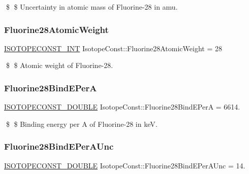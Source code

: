 \$ \$ Uncertainty in atomic mass of Fluorine-\/28 in amu. \mbox{\label{group___isotope_const-_fluorine-_f28_gaa76f1731bebf673389387279e14140bd}} 
\subsubsection{\texorpdfstring{Fluorine28\+Atomic\+Weight}{Fluorine28AtomicWeight}}
{\footnotesize\ttfamily \mbox{\hyperlink{group___isotope_const-_macros_ga5f18360b3e99483a35c32d789e62621c}{I\+S\+O\+T\+O\+P\+E\+C\+O\+N\+S\+T\+\_\+\+I\+NT}} Isotope\+Const\+::\+Fluorine28\+Atomic\+Weight = 28}

\$ \$ Atomic weight of Fluorine-\/28. \mbox{\label{group___isotope_const-_fluorine-_f28_ga71293ff1501021b2b8c144d0992b0a38}} 
\subsubsection{\texorpdfstring{Fluorine28\+Bind\+E\+PerA}{Fluorine28BindEPerA}}
{\footnotesize\ttfamily \mbox{\hyperlink{group___isotope_const-_macros_ga8f45a7272ce02c0b4c65c44636ed719a}{I\+S\+O\+T\+O\+P\+E\+C\+O\+N\+S\+T\+\_\+\+D\+O\+U\+B\+LE}} Isotope\+Const\+::\+Fluorine28\+Bind\+E\+PerA = 6614.}

\$ \$ Binding energy per A of Fluorine-\/28 in keV. \mbox{\label{group___isotope_const-_fluorine-_f28_gaaf6f4f9c20ae3f40e74d9b9031ad07ac}} 
\subsubsection{\texorpdfstring{Fluorine28\+Bind\+E\+Per\+A\+Unc}{Fluorine28BindEPerAUnc}}
{\footnotesize\ttfamily \mbox{\hyperlink{group___isotope_const-_macros_ga8f45a7272ce02c0b4c65c44636ed719a}{I\+S\+O\+T\+O\+P\+E\+C\+O\+N\+S\+T\+\_\+\+D\+O\+U\+B\+LE}} Isotope\+Const\+::\+Fluorine28\+Bind\+E\+Per\+A\+Unc = 14.}

